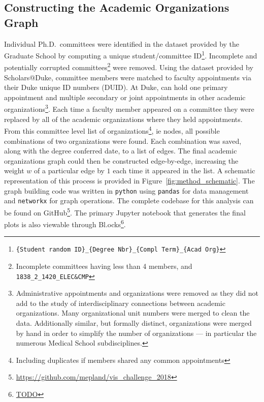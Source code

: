 \documentclass[notitlepage,aps,prd,nofootinbib]{revtex4-1}
\begin{document}
\subsection{Constructing the Academic Organizations Graph}
\label{sec:construct_graph}
Individual Ph.D.\ committees were identified in the  dataset provided by the Graduate School by computing a unique student/committee ID\footnote{\texttt{\{Student random ID\}\_\{Degree Nbr\}\_\{Compl Term\}\_\{Acad Org\}}}. Incomplete and potentially corrupted committees\footnote{Incomplete committees having less than 4 members, and \texttt{1838\_2\_1420\_ELEC\&CMP}} were removed. Using the  dataset provided by Scholars@Duke, committee members were matched to faculty appointments via their Duke unique ID numbers (DUID). At Duke, can hold one primary appointment and multiple secondary or joint appointments in other academic organizations\footnote{Administrative appointments and organizations were removed as they did not add to the study of interdisciplinary connections between academic organizations. Many organizational unit numbers were merged to clean the data. Additionally similar, but formally distinct, organizations were merged by hand in order to simplify the number of organizations --- in particular the numerous Medical School subdisciplines.}. Each time a faculty member appeared on a committee they were replaced by all of the academic organizations where they held appointments. From this committee level list of organizations\footnote{Including duplicates if members shared any common appointments}, ie nodes, all possible combinations of two organizations were found. Each combination was saved, along with the degree conferred date, to a list of edges. The final academic organizations graph could then be constructed edge-by-edge, increasing the weight $w$ of a particular edge by $1$ each time it appeared in the list. A schematic representation of this process is provided in Figure~\ref{fig:method_schematic}. The graph building code was written in \texttt{python} using \texttt{pandas} \cite{pandas} for data management and \texttt{networkx} \cite{networkx} for graph operations. The complete codebase for this analysis can be found on GitHub\footnote{\url{https://github.com/mepland/vis_challenge_2018}}. The primary Jupyter notebook that generates the final plots is also viewable through Bl.ocks\footnote{\url{TODO}}.
\end{document}
